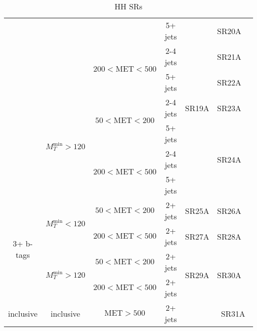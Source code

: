 \documentclass[plain,landscape]{article}
\begin{document}
\begin{table}
\begin{tabular}{|c|c|c|c|c|c|c|}
\cline{4-6}
& & & 5+ jets & \multirow{7}{*}{SR19A} & SR20A &  \\
\cline{3-4} \cline{6-6}
& &  \multirow{2}{*}{ $200 <  \textrm{MET} < 500$} &  2-4 jets & & SR21A & \\
\cline{4-4}  \cline{6-6}
& & & 5+ jets & & SR22A & \\
\cline{2-4} \cline{6-6}
& \multirow{4}{*}{$M_T^{\textrm{min}} > 120$}  & \multirow{2}{*}{ $50 < \textrm{MET} < 200$} & 2-4 jets & &  SR23A & \\
\cline{4-4} \cline{6-6}
& & & 5+ jets & & \multirow{3}{*}{SR24A} &  \\
\cline{3-4}
& &  \multirow{2}{*}{ $200 <  \textrm{MET} < 500$} &  2-4 jets & &  & \\
\cline{4-4} 
& & & 5+ jets & &  & \\
\cline{1-6}
\multirow{4}{*}{3+ b-tags} & \multirow{2}{*}{$M_T^{\textrm{min}} < 120$}  & $50 < \textrm{MET} < 200$ & 2+ jets & SR25A & SR26A & \\
\cline{3-6} 
& & $200 < \textrm{MET} < 500$ & 2+ jets & SR27A & SR28A & \\
\cline{2-6}
&  \multirow{2}{*}{$M_T^{\textrm{min}} > 120$}  & $50 < \textrm{MET} < 200$ & 2+ jets & \multirow{2}{*}{SR29A} & \multirow{2}{*}{SR30A} & \\
\cline{3-4} 
& & $200 < \textrm{MET} < 500$ & 2+ jets &  & &  \\
\hline
inclusive & inclusive & $\textrm{MET} > 500$ & 2+ jets & \cellcolor{black} & \multicolumn{2}{|c|}{SR31A}  \\
\hline
\end{tabular}
\caption{HH SRs}
\end{table}
\end{document}
